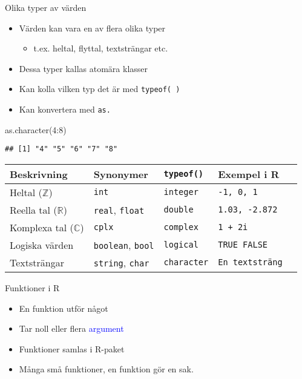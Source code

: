 \documentclass[
  10pt,
  ignorenonframetext,
]{beamer}
\newenvironment{Shaded}{\begin{snugshade}}{\end{snugshade}}
\newcommand{\DecValTok}[1]{\textcolor[rgb]{0.00,0.00,0.81}{#1}}
\newcommand{\FunctionTok}[1]{\textcolor[rgb]{0.00,0.00,0.00}{#1}}
\newcommand{\NormalTok}[1]{#1}
\newcommand{\SpecialCharTok}[1]{\textcolor[rgb]{0.00,0.00,0.00}{#1}}
\providecommand{\tightlist}{%
  \setlength{\itemsep}{0pt}\setlength{\parskip}{0pt}}
\begin{document}
\begin{frame}[fragile]{Olika typer av värden}
\protect\hypertarget{olika-typer-av-vuxe4rden}{}
\begin{itemize}
\tightlist
\item
  Värden kan vara en av flera olika typer

  \begin{itemize}
  \tightlist
  \item
    t.ex. heltal, flyttal, textsträngar etc.
  \end{itemize}
\item
  Dessa typer kallas atomära klasser
\item
  Kan kolla vilken typ det är med \texttt{typeof( )}
\item
  Kan konvertera med \texttt{as.}
\end{itemize}

\begin{Shaded}
\begin{Highlighting}[]
\FunctionTok{as.character}\NormalTok{(}\DecValTok{4}\SpecialCharTok{:}\DecValTok{8}\NormalTok{)}
\end{Highlighting}
\end{Shaded}

\begin{verbatim}
## [1] "4" "5" "6" "7" "8"
\end{verbatim}

\pause

\begin{longtable}[]{@{}lllll@{}}
\toprule
Beskrivning & Synonymer & \texttt{typeof()} & Exempel i R & \\
\midrule
\endhead
Heltal (\(\mathbb{Z}\)) & \texttt{int} & \texttt{integer} &
\texttt{-1,\ 0,\ 1} & \\
Reella tal (\(\mathbb{R}\)) & \texttt{real}, \texttt{float} &
\texttt{double} & \texttt{1.03,\ -2.872} & \\
Komplexa tal (\(\mathbb{C}\)) & \texttt{cplx} & \texttt{complex} &
\texttt{1\ +\ 2i} & \\
Logiska värden & \texttt{boolean}, \texttt{bool} & \texttt{logical} &
\texttt{TRUE\ FALSE} & \\
Textsträngar & \texttt{string}, \texttt{char} & \texttt{character} &
\texttt{En\ textsträng} & \\
\bottomrule
\end{longtable}
\end{frame}

\begin{frame}{Funktioner i R}
\protect\hypertarget{funktioner-i-r}{}
\begin{itemize}
\tightlist
\item
  En funktion utför något
\item
  Tar noll eller flera \textcolor{blue}{argument}
\item
  Funktioner samlas i R-paket
\item
  Många små funktioner, en funktion gör en sak.
\end{itemize}
\end{frame}
\end{document}
